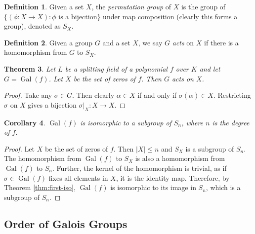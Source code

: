 \documentclass[12pt]{article}
\newtheorem{theorem}{Theorem}
\newtheorem{corollary}[theorem]{Corollary}
\theoremstyle{definition}
\newtheorem{definition}[theorem]{Definition}
\newcommand{\Gal}{\operatorname{Gal}}
\begin{document}
\begin{definition}
	Given a set $X$, the \textit{permutation group} of $X$ is the group of $\{ (\phi : X \to X) : \phi \text{ is a bijection} \}$ under map composition (clearly this forms a group), denoted as $S_X$. 
\end{definition}

\begin{definition}
	Given a group $G$ and a set $X$, we say $G$ \textit{acts} on $X$ if there is a homomorphism from $G$ to $S_X$.
\end{definition}

\begin{theorem} \label{thm:galois-group-acts-on-zeros}
	Let $L$ be a splitting field of a polynomial $f$ over $K$ and let $G = \Gal(f)$. Let $X$ be the set of zeros of $f$. Then $G$ acts on $X$.
\end{theorem}

\begin{proof}
	Take any $\sigma \in G$. Then clearly $\alpha \in X$ if and only if $\sigma(\alpha) \in X$. Restricting $\sigma$ on $X$ gives a bijection $\sigma | _X : X \to X$. 
\end{proof}


\begin{corollary} \label{thm:galois-group-isomorphic-symmetric-subgroup}
	$\Gal(f)$ is isomorphic to a subgroup of $S_n$, where $n$ is the degree of $f$. 
\end{corollary}

\begin{proof}
	Let $X$ be the set of zeros of $f$. Then $|X| \le n$ and $S_X$ is a subgroup of $S_n$. The homomorphism from $\Gal(f)$ to $S_X$ is also a homomorphism from $\Gal(f)$ to $S_n$. Further, the kernel of the homomorphism is trivial, as if $\sigma \in \Gal(f)$ fixes all elements in $X$, it is the identity map. Therefore, by Theorem \ref{thm:first-iso}, $\Gal(f)$ is isomorphic to its image in $S_n$, which is a subgroup of $S_n$. 
\end{proof}






\subsection{Order of Galois Groups}
\end{document}
